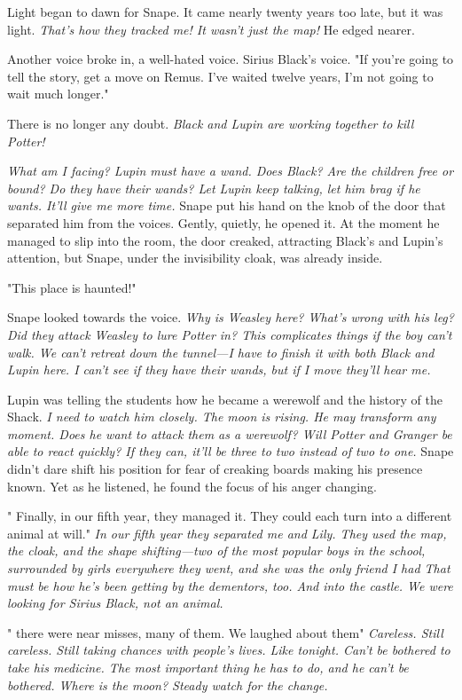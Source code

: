 Light began to dawn for Snape. It came nearly twenty years too late, but it was light. \emph{That's how they tracked me! It wasn't just the map!} He edged nearer.

Another voice broke in, a well-hated voice. Sirius Black's voice. "If you're going to tell the story, get a move on Remus. I've waited twelve years, I'm not going to wait much longer."

There is no longer any doubt. \emph{Black and Lupin are working together to kill Potter!}

\emph{What am I facing? Lupin must have a wand. Does Black? Are the children free or bound? Do they have their wands? Let Lupin keep talking, let him brag if he wants. It'll give me more time.} Snape put his hand on the knob of the door that separated him from the voices. Gently, quietly, he opened it. At the moment he managed to slip into the room, the door creaked, attracting Black's and Lupin's attention, but Snape, under the invisibility cloak, was already inside.

"This place is haunted!"

Snape looked towards the voice. \emph{Why is Weasley here? What's wrong with his leg? Did they attack Weasley to lure Potter in? This complicates things if the boy can't walk. We can't retreat down the tunnel—I have to finish it with both Black and Lupin here. I can't see if they have their wands, but if I move they'll hear me.}

Lupin was telling the students how he became a werewolf and the history of the Shack. \emph{I need to watch him closely. The moon is rising. He may transform any moment. Does he want to attack them as a werewolf? Will Potter and Granger be able to react quickly? If they can, it'll be three to two instead of two to one.} Snape didn't dare shift his position for fear of creaking boards making his presence known. Yet as he listened, he found the focus of his anger changing.

"{\el} Finally, in our fifth year, they managed it. They could each turn into a different animal at will." \emph{In our fifth year they separated me and Lily. They used the map, the cloak, and the shape shifting—two of the most popular boys in the school, surrounded by girls everywhere they went, and she was the only friend I had{\el} That must be how he's been getting by the dementors, too. And into the castle. We were looking for Sirius Black, not an animal.}

"{\el} there were near misses, many of them. We laughed about them{\el}" \emph{Careless. Still careless. Still taking chances with people's lives. Like tonight. Can't be bothered to take his medicine. The most important thing he has to do, and he can't be bothered. Where is the moon? Steady{\el} watch for the change.}

